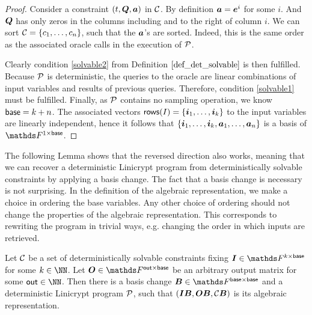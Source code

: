\begin{proof}
    Consider a constraint $(t, \Q, \va)$ in $\C$.
    By definition $\va = \ve^i$ for some $i$.
    And $\Q$ has only zeros in the columns including and to the right of column $i$.
    We can sort $\C = \{\dts c n\}$, such that the $\va$'s are sorted.
    Indeed, this is the same order as the associated oracle calls in the execution of $\P$.
    
    Clearly condition \ref{solvable2} from Definition $\ref{def_det_solvable}$ is then fulfilled.
    Because $\P$ is deterministic, 
    the queries to the oracle are linear combinations of input variables and results of previous queries.
    Therefore, condition \ref{solvable1} must be fulfilled.
    Finally, as $\P$ contains no sampling operation, we know $\base = k + n$.
    The associated vectors $\rows(I) = \{ \dts \vi k \}$ to the input variables are linearly independent,
    hence it follows that $\{ \dts \vi k, \dts \va n \}$ is a basis of $\F^{1\times\base}$. 
\end{proof}

The following Lemma shows that the reversed direction also works,
meaning that we can recover a deterministic Linicrypt program from deterministically solvable constraints by applying a basis change.
The fact that a basis change is necessary is not surprising.
In the definition of the algebraic representation,
we make a choice in ordering the base variables.
Any other choice of ordering should not change the properties of the algebraic representation.
This corresponds to rewriting the program in trivial ways,
e.g. changing the order in which inputs are retrieved.

\begin{lemma}
\label{det_solvable_lemma}
    Let $\C$ be a set of deterministically solvable constraints fixing $\Inp \in \F^{k \times \base}$ for some $k \in \NN$.
    Let $\O \in \F^{\out \times \base}$ be an arbitrary output matrix for some $\out \in \NN$.
    Then there is a basis change $\B \in \F^{\base \times \base}$
    and a deterministic Linicrypt program $\P$,
    such that $(\Inp \B, \O \B, \C \B)$ is its algebraic representation.
\end{lemma}

